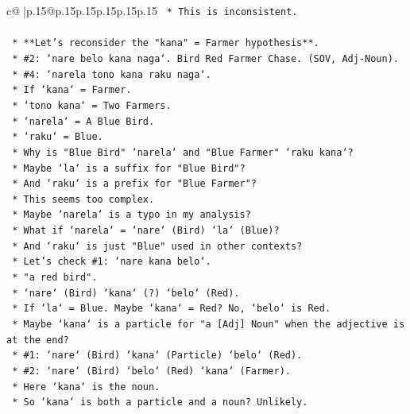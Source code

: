 \documentclass{article}
\begin{document}
{\begin{supertabular}{c@{$\;$}|p{.15\linewidth}@{}p{.15\linewidth}p{.15\linewidth}p{.15\linewidth}p{.15\linewidth}p{.15\linewidth}}
{{{\texttt{        *   This is inconsistent.} \\
\\ 
\texttt{    *   **Let's reconsider the "kana" = Farmer hypothesis**.} \\
\texttt{        *   \#2: `nare belo kana naga`. Bird Red Farmer Chase. (SOV, Adj{-}Noun).} \\
\texttt{        *   \#4: `narela tono kana raku naga`.} \\
\texttt{            *   If `kana` = Farmer.} \\
\texttt{            *   `tono kana` = Two Farmers.} \\
\texttt{            *   `narela` = A Blue Bird.} \\
\texttt{            *   `raku` = Blue.} \\
\texttt{            *   Why is "Blue Bird" `narela` and "Blue Farmer" `raku kana`?} \\
\texttt{            *   Maybe `la` is a suffix for "Blue Bird"?} \\
\texttt{            *   And `raku` is a prefix for "Blue Farmer"?} \\
\texttt{            *   This seems too complex.} \\
\texttt{            *   Maybe `narela` is a typo in my analysis?} \\
\texttt{            *   What if `narela` = `nare` (Bird) `la` (Blue)?} \\
\texttt{            *   And `raku` is just "Blue" used in other contexts?} \\
\texttt{            *   Let's check \#1: `nare kana belo`.} \\
\texttt{                *   "a red bird".} \\
\texttt{                *   `nare` (Bird) `kana` (?) `belo` (Red).} \\
\texttt{                *   If `la` = Blue. Maybe `kana` = Red? No, `belo` is Red.} \\
\texttt{                *   Maybe `kana` is a particle for "a {[}Adj{]} Noun" when the adjective is at the end?} \\
\texttt{                *   \#1: `nare` (Bird) `kana` (Particle) `belo` (Red).} \\
\texttt{                *   \#2: `nare` (Bird) `belo` (Red) `kana` (Farmer).} \\
\texttt{                    *   Here `kana` is the noun.} \\
\texttt{                    *   So `kana` is both a particle and a noun? Unlikely.} \\
}}}
\end{supertabular}}
\end{document}
